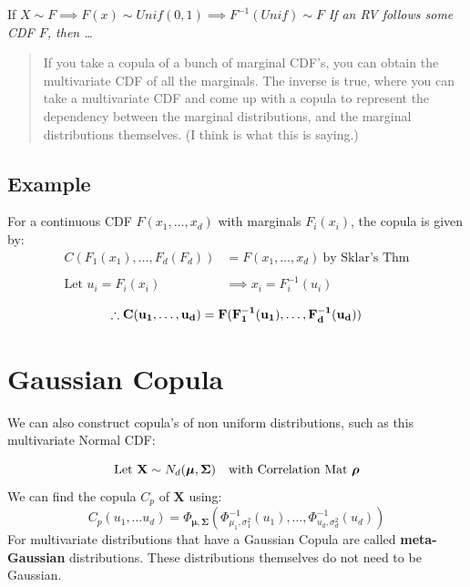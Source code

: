 \documentclass[
  oneside]{book}
\begin{document}
If \(X \sim F \implies F(x) \sim Unif(0,1) \implies F^{-1}(Unif) \sim F\)
\emph{If an RV follows some CDF \(F\), then \ldots{}}

\begin{quote}
If you take a copula of a bunch of marginal CDF's, you can obtain the multivariate CDF of all the marginals. The inverse is true, where you can take a multivariate CDF and come up with a copula to represent the dependency between the marginal distributions, and the marginal distributions themselves. (I think is what this is saying.)
\end{quote}

\hypertarget{example}{%
\subsection{Example}\label{example}}

For a continuous CDF \(F(x_{1},\dots,x_{d})\) with marginals \(F_{i}(x_{i})\), the copula is given by:
\[
\begin{aligned}
C(F_{1}(x_{1}),\dots,F_{d}(F_{d})) &= F(x_{1},\dots,x_{d}) \ \text{by Sklar's Thm}\\
\\
\text{Let } u_{i}= F_{i}(x_{i}) &\implies x_{i} = F_{i}^{-1}(u_{i})\\
\end{aligned}
\]
\[
\therefore \mathbf{C(u_{1},\dots,u_{d}) = F(F_{1}^{-1}(u_{1}),\dots,F_{d}^{-1}(u_{d}))}\\
\]

\hypertarget{gaussian-copula}{%
\section{Gaussian Copula}\label{gaussian-copula}}

We can also construct copula's of non uniform distributions, such as this multivariate Normal CDF:

\[
\text{Let } \mathbf{X}\sim N_{d}(\boldsymbol{\mu}, \boldsymbol{\Sigma}) \quad \text{with Correlation Mat} \ \boldsymbol{\rho}\\
\]
We can find the copula \(C_{p}\) of \(\mathbf{X}\) using:
\[
C_{p}(u_{1},\dots u_{d}) = \Phi_{\boldsymbol{\mu},\boldsymbol{\Sigma}}(\Phi_{\mu_{1},\sigma_{1}^{2}}^{-1}(u_{1}), \dots, \Phi_{u_{d},\sigma_{d}^{2}}^{-1}(u_{d}))
\]
For multivariate distributions that have a Gaussian Copula are called \textbf{meta-Gaussian} distributions. These distributions themselves do not need to be Gaussian.
\end{document}
